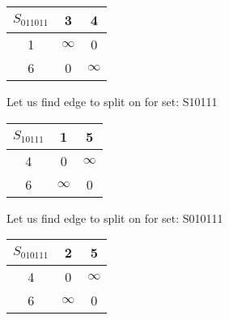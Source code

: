 \documentclass[a4paper,10pt]{report} %
\begin{document}
\begin{table}[ht]
\hfill
{}
\end{table}


\begin{tabular}[]{|c|c|c|}
\hline
$S_{011011 }$& 3 & 4\\
\hline
1 & $\infty$ &      0\\
\hline
6 &      0 & $\infty$\\
\hline
\end{tabular}
\newpage


Let us find edge to split on for set: S10111\\
\begin{flushleft}\begin{tabular}[]{|c|c|c|}
\hline
$S_{10111 }$& 1 & 5\\
\hline
4 &      0 & $\infty$\\
\hline
6 & $\infty$ &      0\\
\hline
\end{tabular}
\end{flushleft}



\newpage




Let us find edge to split on for set: S010111\\
\begin{flushleft}\begin{tabular}[]{|c|c|c|}
\hline
$S_{010111 }$& 2 & 5\\
\hline
4 &      0 & $\infty$\\
\hline
6 & $\infty$ &      0\\
\hline
\end{tabular}
\end{flushleft}
\end{document}
